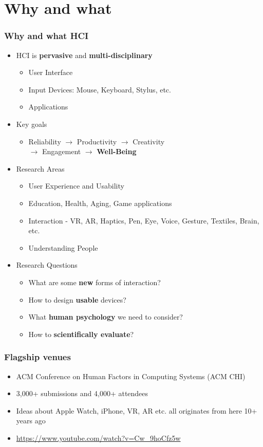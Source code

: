 \documentclass{beamer}
\begin{document}
\section{Why and what} %

\begin{frame}
\frametitle{Why and what HCI}
\begin{itemize}
	\item HCI is \textbf{pervasive} and \textbf{multi-disciplinary}
	\begin{itemize}
		\item User Interface
		\item Input Devices: Mouse, Keyboard, Stylus, etc.
		\item Applications
	\end{itemize}
	\item Key goals
	\begin{itemize}
		\item Reliability $\rightarrow$ Productivity $\rightarrow$ Creativity \\  $\rightarrow$ Engagement $\rightarrow$ \textbf{Well-Being }
	\end{itemize}
	\item Research Areas
	\begin{itemize}
		\item User Experience and Usability
		\item Education, Health, Aging, Game applications
		\item Interaction - VR, AR, Haptics, Pen, Eye, Voice, Gesture, Textiles, Brain, etc.
		\item Understanding People
	\end{itemize}
	\item Research Questions
	\begin{itemize}
		\item What are some \textbf{new} forms of interaction?
		\item How to design \textbf{usable} devices?
		\item What \textbf{human psychology} we need to consider?
		\item How to \textbf{scientifically evaluate}?
	\end{itemize}
\end{itemize}
\end{frame}

\begin{frame}
\frametitle{Flagship venues}
\begin{itemize}
	\item ACM Conference on Human Factors in Computing Systems (ACM CHI)
	\item 3,000+ submissions and 4,000+ attendees
	\item Ideas about Apple Watch, iPhone, VR, AR etc. all originates from here 10+ years ago
	\item \url{https://www.youtube.com/watch?v=Cw_9hoCfz5w}
\end{itemize}
\end{frame}
\end{document}
